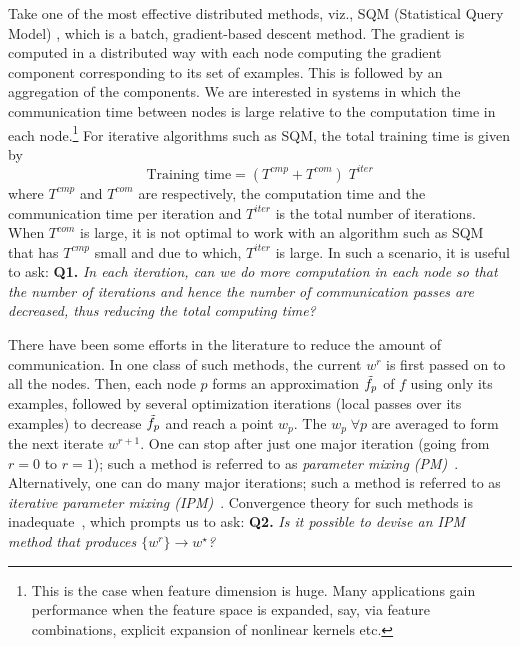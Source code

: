 \documentclass[twoside, 11pt]{article}
\begin{document}
Take one of the most effective distributed methods, viz., SQM (Statistical Query Model) \citep{chu2006,agarwal2011}, which is a batch, gradient-based descent method. The gradient is computed in a distributed way with each node computing the gradient component corresponding to its set of examples. This is followed by an aggregation of the components. We are interested in systems in which the communication time between nodes is large relative to the computation time in each node.\footnote{This is the case when feature dimension is huge. Many applications gain performance when the feature space is expanded, say, via feature combinations, explicit expansion of nonlinear kernels etc.} For iterative algorithms such as SQM, the total training time is given by
\begin{equation}
\mbox{Training time} = (T^{cmp} + T^{com})\; T^{iter}
\end{equation}
where $T^{cmp}$ and $T^{com}$ are respectively, the computation time and the communication time per iteration and $T^{iter}$ is the total number of iterations. When $T^{com}$ is large, it is not optimal to work with an algorithm such as SQM that has $T^{cmp}$ small and due to which, $T^{iter}$ is large.
In such a scenario, it is useful to ask: {\bf Q1.} {\it In each iteration, can we do more computation in each node so that the number of iterations and hence the number of communication passes are decreased, thus reducing the total computing time?}

There have been some efforts in the literature to reduce the amount of communication. In one class of such methods, the current $w^r$ is first passed on to all the nodes. Then, each node $p$ forms an approximation $\tilde{f}_p$ of $f$ using only its examples, followed by several optimization iterations (local passes over its examples) to decrease $\tilde{f}_p$ and reach a point $w_p$. The $w_p\;\forall p$ are averaged to form the next iterate $w^{r+1}$. One can stop after just one major iteration (going from $r=0$ to $r=1$); such a method is referred to as {\it parameter mixing (PM)}~\citep{mann2009}. Alternatively, one can do many major iterations; such a method is referred to as {\it iterative parameter mixing (IPM)}~\citep{hall2010}. Convergence theory for such methods is inadequate~\citep{mann2009, mcdonald2010}, which prompts us to ask: {\bf Q2.} {\it Is it possible to devise an IPM method that produces $\{w^r\} \rightarrow w^\star$?}
\end{document}
